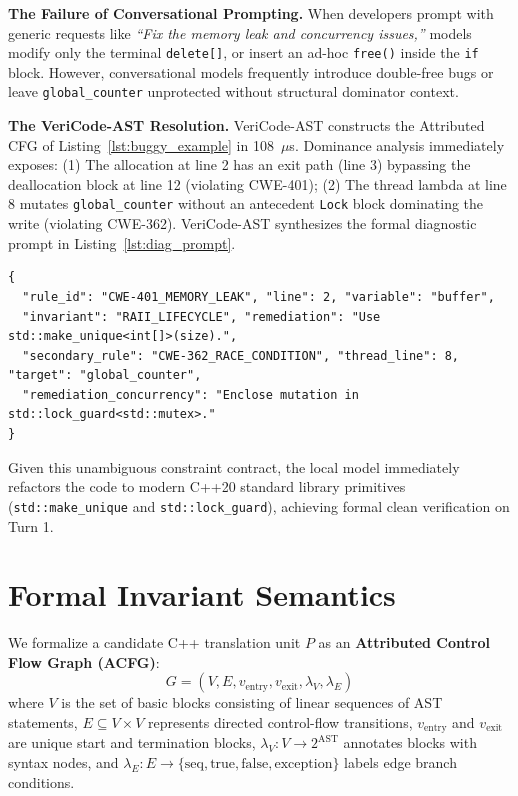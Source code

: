 \documentclass[sigconf,screen,nonacm,pbalance]{acmart}
\begin{document}
\noindent\textbf{The Failure of Conversational Prompting.} When developers prompt with generic requests like \textit{``Fix the memory leak and concurrency issues,''} models modify only the terminal \texttt{delete[]}, or insert an ad-hoc \texttt{free()} inside the \texttt{if} block. However, conversational models frequently introduce double-free bugs or leave \texttt{global\_counter} unprotected without structural dominator context.

\noindent\textbf{The VeriCode-AST Resolution.} VeriCode-AST constructs the Attributed CFG of Listing~\ref{lst:buggy_example} in 108~$\mu$s. Dominance analysis immediately exposes: (1) The allocation at line 2 has an exit path (line 3) bypassing the deallocation block at line 12 (violating CWE-401); (2) The thread lambda at line 8 mutates \texttt{global\_counter} without an antecedent \texttt{Lock} block dominating the write (violating CWE-362). VeriCode-AST synthesizes the formal diagnostic prompt in Listing~\ref{lst:diag_prompt}.

\begin{lstlisting}[language={}, caption={Structured diagnostic synthesized by VeriCode-AST.}, label={lst:diag_prompt}]
{
  "rule_id": "CWE-401_MEMORY_LEAK", "line": 2, "variable": "buffer",
  "invariant": "RAII_LIFECYCLE", "remediation": "Use std::make_unique<int[]>(size).",
  "secondary_rule": "CWE-362_RACE_CONDITION", "thread_line": 8, "target": "global_counter",
  "remediation_concurrency": "Enclose mutation in std::lock_guard<std::mutex>."
}
\end{lstlisting}

Given this unambiguous constraint contract, the local model immediately refactors the code to modern C++20 standard library primitives (\texttt{std::make\_unique} and \texttt{std::lock\_guard}), achieving formal clean verification on Turn 1.

\section{Formal Invariant Semantics}
\label{sec:semantics}

We formalize a candidate C++ translation unit $P$ as an \textbf{Attributed Control Flow Graph (ACFG)}:
\begin{equation}
    G = (V, E, v_{\text{entry}}, v_{\text{exit}}, \lambda_V, \lambda_E)
\end{equation}
where $V$ is the set of basic blocks consisting of linear sequences of AST statements, $E \subseteq V \times V$ represents directed control-flow transitions, $v_{\text{entry}}$ and $v_{\text{exit}}$ are unique start and termination blocks, $\lambda_V: V \to 2^{\text{AST}}$ annotates blocks with syntax nodes, and $\lambda_E: E \to \{\text{seq}, \text{true}, \text{false}, \text{exception}\}$ labels edge branch conditions.
\end{document}
